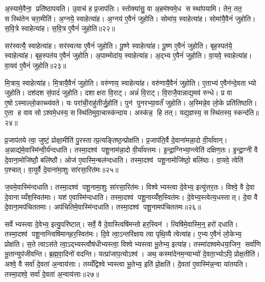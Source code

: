 अ॒स्यामे॒वैना॒ प्रति॑ष्ठापयति। उ॒वाच॑ ह प्र॒जाप॑तिः। स्तोक्या॑सु॒ वा अ॒हम॑श्वमे॒ध सस्था॑पयामि। तेन॒ तत॒ सस्थि॑तेन चरा॒मीति॑। अ॒ग्नये॒ स्वाहेत्या॑ह। अ॒ग्नय॑ ए॒वैनं॑ जुहोति। सोमा॑य॒ स्वाहेत्या॑ह। सोमा॑यै॒वैनं॑ जुहोति। स॒वि॒त्रे स्वाहेत्या॑ह। स॒वि॒त्र ए॒वैनं॑ जुहोति॥२२॥

सर॑स्वत्यै॒ स्वाहेत्या॑ह। सर॑स्वत्या ए॒वैनं॑ जुहोति। पू॒ष्णे स्वाहेत्या॑ह। पू॒ष्ण ए॒वैनं॑ जुहोति। बृह॒स्पत॑ये॒ स्वाहेत्या॑ह। बृह॒स्पत॑य ए॒वैनं॑ जुहोति। अ॒पाम्मोदा॑य॒ स्वाहेत्या॑ह। अ॒द्भ्य ए॒वैनं॑ जुहोति। वा॒यवे॒ स्वाहेत्या॑ह। वा॒यव॑ ए॒वैनं॑ जुहोति॥२३॥

मि॒त्राय॒ स्वाहेत्या॑ह। मि॒त्रायै॒वैनं॑ जुहोति। वरु॑णाय॒ स्वाहेत्या॑ह। वरु॑णायै॒वैनं॑ जुहोति। ए॒ताभ्य॑ ए॒वैन॑न्दे॒वताभ्यो जुहोति। दश॑दश सं॒पादं॑ जुहोति। दशाक्षरा वि॒राट्। अन्नं॑ वि॒राट्। वि॒राजै॒वान्नाद्य॒मव॑ रुन्धे। प्र वा ए॒षोऽस्माल्लो॒काच्च्य॑वते। यः परा॑ची॒राहु॑तीर्जु॒होति॑। पुन॑ पुनरभ्या॒वर्तं॑ जुहोति। अ॒स्मिन्ने॒व लो॒के प्रति॑तिष्ठति। ए॒ता ह वाव सोऽश्वमे॒धस्य॒ सस्थि॑तिमुवा॒चास्क॑न्दाय। अस्क॑न्न॒ हि तत्। यद्य॒ज्ञस्य॒ सस्थि॑तस्य॒ स्कन्द॑ति॥२४॥\anuvakamend[अ॒भिजि॑त्यै वैश्वान॒रः स॑वि॒त्र ए॒वैनं॑ जुहोति वा॒यव॑ ए॒वैनं॑ जुहोति च्यवते॒ षट् च॑]

प्र॒जाप॑तये त्वा॒ जुष्टं॒ प्रोक्षा॒मीति॑ पु॒रस्तात्प्र॒त्यङ्तिष्ठ॒न्प्रोक्ष॑ति। प्र॒जाप॑ति॒र्वै दे॒वाना॑मन्ना॒दो वी॒र्या॑वान्। अ॒न्नाद्य॑मे॒वास्मि॑न्वी॒र्य॑न्दधाति। तस्मा॒दश्व॑ पशू॒नाम॑न्ना॒दो वी॒र्या॑वत्तमः। इ॒न्द्रा॒ग्निभ्या॒न्त्वेति॑ दक्षिण॒तः। इ॒न्द्रा॒ग्नी वै दे॒वाना॒मोजि॑ष्ठौ॒ बलि॑ष्ठौ। ओज॑ ए॒वास्मि॒न्बल॑न्दधाति। तस्मा॒दश्व॑ पशू॒नामोजि॑ष्ठो॒ बलि॑ष्ठः। वा॒यवे॒ त्वेति॑ प॒श्चात्। वा॒युर्वै दे॒वाना॑मा॒शुः सा॑रसा॒रित॑मः॥२५॥

ज॒वमे॒वास्मि॑न्दधाति। तस्मा॒दश्व॑ पशू॒नामा॒शुः सा॑रसा॒रित॑मः। विश्वेभ्यस्त्वा दे॒वेभ्य॒ इत्यु॑त्तर॒तः। विश्वे॒ वै दे॒वा दे॒वानाय्यँश॒स्वित॑माः। यश॑ ए॒वास्मि॑न्दधाति। तस्मा॒दश्व॑ पशू॒नाय्यँ॑श॒स्वित॑मः। दे॒वेभ्य॒स्त्वेत्य॒धस्तात्। दे॒वा वै दे॒वाना॒मप॑चिततमाः। अप॑चितिमे॒वास्मि॑न्दधाति। तस्मा॒दश्व॑ पशू॒नामप॑चिततमः॥२६॥

सर्वेभ्यस्त्वा दे॒वेभ्य॒ इत्यु॒परि॑ष्टात्। सर्वे॒ वै दे॒वास्त्विषि॑मन्तो हर॒स्विन॑। त्विषि॑मे॒वास्मि॒न्॒ हरो॑ दधाति। तस्मा॒दश्व॑ पशू॒नान्त्विषि॑मान्‌हर॒स्वित॑मः। दि॒वे त्वा॒ऽन्तरि॑क्षाय त्वा पृथि॒व्यै त्वेत्या॑ह। ए॒भ्य ए॒वैनं॑ लो॒केभ्य॒ प्रोक्ष॑ति। स॒ते त्वाऽस॑ते त्वा॒ऽद्भ्यस्त्वौष॑धीभ्यस्त्वा॒ विश्वेभ्यस्त्वा भू॒तेभ्य॒ इत्या॑ह। तस्मा॑दश्वमेधया॒जिन॒ सर्वा॑णि भू॒तान्युप॑जीवन्ति। ब्र॒ह्म॒वा॒दिनो॑ वदन्ति। यत्प्रा॑जाप॒त्योऽश्व॑। अथ॒ कस्मा॑देनम॒न्याभ्यो॑ दे॒वता॒भ्योऽपि॒ प्रोक्ष॒तीति॑। अश्वे॒ वै सर्वा॑ दे॒वता॑ अ॒न्वाय॑त्ताः। तय्यँद्विश्वेभ्यस्त्वा भू॒तेभ्य॒ इति॑ प्रो॒क्षति॑। दे॒वता॑ ए॒वास्मि॑न्न॒न्वा या॑तयति। तस्मा॒दश्वे॒ सर्वा॑ दे॒वता॑ अ॒न्वाय॑त्ताः॥२७॥\anuvakamend[सा॒र॒सा॒रित॒मोऽप॑चिततमः प्राजाप॒त्योऽश्व॒ पञ्च॑ च]

